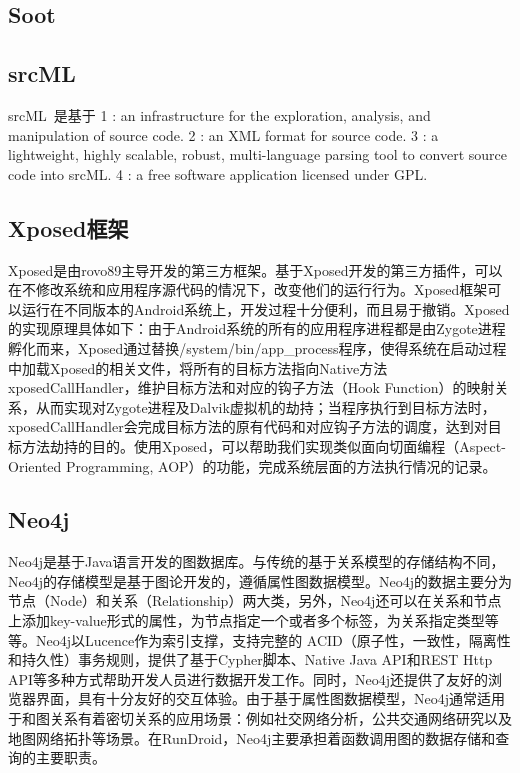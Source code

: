 \subsection{Soot}

\subsection{srcML}
srcML~\cite{collard2013srcml}是基于
1 : an infrastructure for the exploration, analysis, and manipulation of source code.
2 : an XML format for source code.
3 : a lightweight, highly scalable, robust, multi-language parsing tool to convert source code into srcML.
4 : a free software application licensed under GPL.


\subsection{Xposed框架}
Xposed是由rovo89主导开发的第三方框架。基于Xposed开发的第三方插件，可以在不修改系统和应用程序源代码的情况下，改变他们的运行行为。Xposed框架可以运行在不同版本的Android系统上，开发过程十分便利，而且易于撤销。Xposed的实现原理具体如下：由于Android系统的所有的应用程序进程都是由Zygote进程孵化而来，Xposed通过替换/system/bin/app\_process程序，使得系统在启动过程中加载Xposed的相关文件，将所有的目标方法指向Native方法xposedCallHandler，维护目标方法和对应的钩子方法（Hook Function）的映射关系，从而实现对Zygote进程及Dalvik虚拟机的劫持；当程序执行到目标方法时，xposedCallHandler会完成目标方法的原有代码和对应钩子方法的调度，达到对目标方法劫持的目的。使用Xposed，可以帮助我们实现类似面向切面编程（Aspect-Oriented Programming, AOP）的功能，完成系统层面的方法执行情况的记录。
\subsection{Neo4j}
Neo4j是基于Java语言开发的图数据库。与传统的基于关系模型的存储结构不同，Neo4j的存储模型是基于图论开发的，遵循属性图数据模型。Neo4j的数据主要分为节点（Node）和关系（Relationship）两大类，另外，Neo4j还可以在关系和节点上添加key-value形式的属性，为节点指定一个或者多个标签，为关系指定类型等等。Neo4j以Lucence作为索引支撑，支持完整的 ACID（原子性，一致性，隔离性和持久性）事务规则，提供了基于Cypher脚本、Native Java API和REST Http API等多种方式帮助开发人员进行数据开发工作。同时，Neo4j还提供了友好的浏览器界面，具有十分友好的交互体验。由于基于属性图数据模型，Neo4j通常适用于和图关系有着密切关系的应用场景：例如社交网络分析，公共交通网络研究以及地图网络拓扑等场景。在RunDroid，Neo4j主要承担着函数调用图的数据存储和查询的主要职责。

